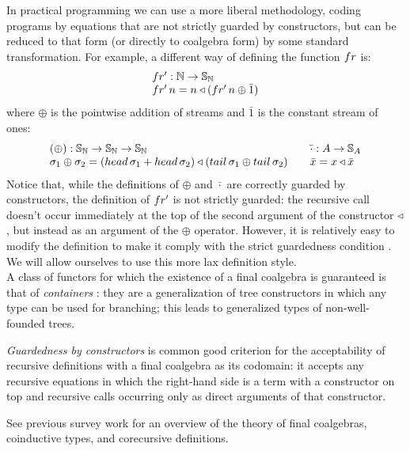 In practical programming we can use a more liberal methodology, coding programs by equations that are not strictly guarded by constructors, but can be reduced to that form (or directly to coalgebra form) by some standard transformation.
For example, a different way of defining the function $\sfr$ is:
$$
\begin{array}{l}
\sfp: \nat \rightarrow \stream{\nat}\\
\sfp\,n = n \scons (\sfp\,n \oplus \bar{1})
\end{array}
$$
where $\oplus$ is the pointwise addition of streams and $\bar{1}$ is the constant stream of ones:
$$
\begin{array}{l}
(\oplus): \stream{\nat}\rightarrow \stream{\nat}\rightarrow \stream{\nat}\\
\sigma_1 \oplus \sigma_2 = (\head\,\sigma_1 + \head\,\sigma_2) \scons (\tail\,\sigma_1 \oplus \tail\,\sigma_2)
\end{array}
\quad
\begin{array}{l}
\bar{\cdot}: A \rightarrow \stream{A}\\
\bar{x} = x \scons \bar{x}
\end{array}
$$
Notice that, while the definitions of $\oplus$ and $\bar{\cdot}$ are correctly guarded by constructors, the definition of $\sfp$ is not strictly guarded: the recursive call doesn't occur immediately at the top of the second argument of the constructor $\triangleleft$, but instead as an argument of the $\oplus$ operator.
However, it is relatively easy to modify the definition to make it comply with the strict guardedness condition \cite{capretta:2011}.
We will allow ourselves to use this more lax definition style. \\

A class of functors for which the existence of a final coalgebra is guaranteed is that of {\em containers} \cite{AAG:2005}: they are a generalization of tree constructors in which any type can be used for branching; this leads to generalized types of non-well-founded trees.

{\em Guardedness by constructors} is common good criterion for the acceptability of recursive definitions with a final coalgebra as its codomain: it accepts any recursive equations in which the right-hand side is a term with a constructor on top and recursive calls occurring only as direct arguments of that constructor.

See previous survey work \cite{capretta:2011} for an overview of the theory of final coalgebras, coinductive types, and corecursive definitions.


